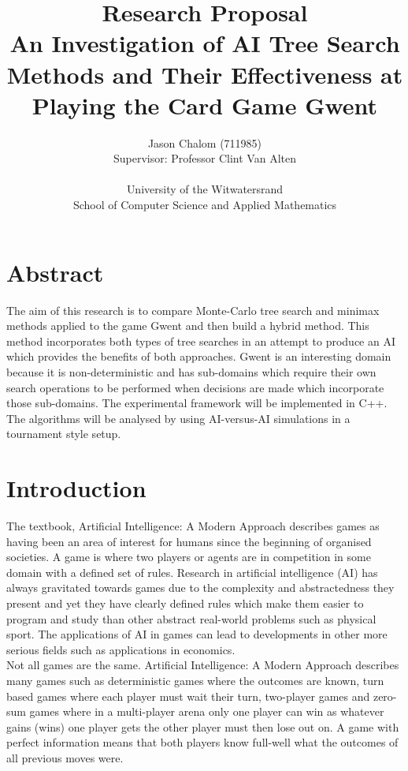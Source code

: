 \documentclass [11pt]{article}
\title{Research Proposal\\\medskip An Investigation of AI Tree Search Methods and Their Effectiveness at Playing the Card Game Gwent\\\medskip}
\author{Jason Chalom (711985)\\Supervisor: Professor Clint Van Alten\\\\University of the Witwatersrand\\School of Computer Science and Applied Mathematics}
\begin{document}
	\maketitle
	\vfill
	
	\break
	
	\tableofcontents
	\break
	
	\section*{Abstract}
	The aim of this research is to compare Monte-Carlo tree search and minimax methods applied to the game Gwent and then build a hybrid method. This method incorporates both types of tree searches in an attempt to produce an AI which provides the benefits of both approaches. Gwent is an interesting domain because it is non-deterministic and has sub-domains which require their own search operations to be performed when decisions are made which incorporate those sub-domains. The experimental framework will be implemented in C++. The algorithms will be analysed by using AI-versus-AI simulations in a tournament style setup.
	
	\section{Introduction}
	The textbook, Artificial Intelligence: A Modern Approach \cite{AIModern} describes games as having been an area of interest for humans since the beginning of organised societies. A game is where two players or agents are in competition in some domain with a defined set of rules. Research in artificial intelligence (AI) has always gravitated towards games due to the complexity and abstractedness they present and yet they have clearly defined rules which make them easier to program and study than other abstract real-world problems such as physical sport. The applications of AI in games can lead to developments in other more serious fields such as applications in economics. \\
	
	\noindent Not all games are the same. Artificial Intelligence: A Modern Approach \cite{AIModern} describes many games such as deterministic games where the outcomes are known, turn based games where each player must wait their turn, two-player games and zero-sum games where in a multi-player arena only one player can win as whatever gains (wins) one player gets the other player must then lose out on. A game with perfect information means that both players know full-well what the outcomes of all previous moves were. \\
	
\end{document}
